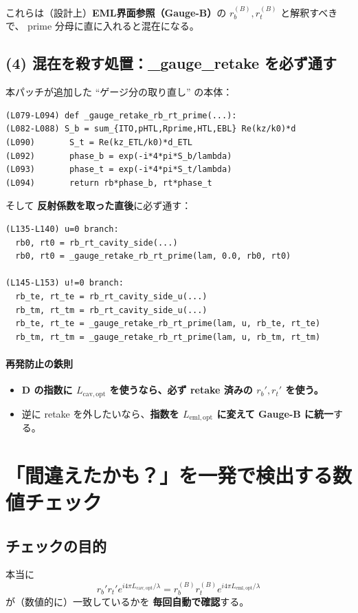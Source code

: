 \documentclass[a4paper,11pt]{article}
\begin{document}
\noindent
これらは（設計上）\textbf{EML界面参照（Gauge-B）}の \(r_b^{(B)},r_t^{(B)}\) と解釈すべきで、
prime 分母に直に入れると混在になる。

\subsection{(4) 混在を殺す処置：\_gauge\_retake を必ず通す}
本パッチが追加した ``ゲージ分の取り直し'' の本体：

\begin{lstlisting}
(L079-L094) def _gauge_retake_rb_rt_prime(...):
(L082-L088) S_b = sum_{ITO,pHTL,Rprime,HTL,EBL} Re(kz/k0)*d
(L090)       S_t = Re(kz_ETL/k0)*d_ETL
(L092)       phase_b = exp(-i*4*pi*S_b/lambda)
(L093)       phase_t = exp(-i*4*pi*S_t/lambda)
(L094)       return rb*phase_b, rt*phase_t
\end{lstlisting}

そして \textbf{反射係数を取った直後}に必ず通す：

\begin{lstlisting}
(L135-L140) u=0 branch:
  rb0, rt0 = rb_rt_cavity_side(...)
  rb0, rt0 = _gauge_retake_rb_rt_prime(lam, 0.0, rb0, rt0)

(L145-L153) u!=0 branch:
  rb_te, rt_te = rb_rt_cavity_side_u(...)
  rb_tm, rt_tm = rb_rt_cavity_side_u(...)
  rb_te, rt_te = _gauge_retake_rb_rt_prime(lam, u, rb_te, rt_te)
  rb_tm, rt_tm = _gauge_retake_rb_rt_prime(lam, u, rb_tm, rt_tm)
\end{lstlisting}

\paragraph{再発防止の鉄則}
\begin{itemize}
  \item \textbf{D の指数に \(L_{\mathrm{cav,opt}}\) を使うなら、必ず retake 済みの \(r_b',r_t'\) を使う。}
  \item 逆に retake を外したいなら、\textbf{指数を \(L_{\mathrm{eml,opt}}\) に変えて Gauge-B に統一}する。
\end{itemize}

\section{「間違えたかも？」を一発で検出する数値チェック}
\subsection{チェックの目的}
本当に
\[
r_b' r_t' e^{i4\pi L_{\mathrm{cav,opt}}/\lambda}
=
r_b^{(B)} r_t^{(B)} e^{i4\pi L_{\mathrm{eml,opt}}/\lambda}
\]
が（数値的に）一致しているかを \textbf{毎回自動で確認}する。
\end{document}

